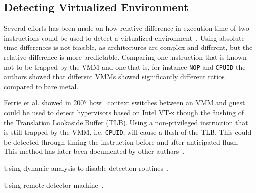 \subsection{Detecting Virtualized Environment}



Several efforts has been made on how relative difference in execution time of
two instructions could be used to detect a virtualized
environment~\cite{raffetseder2007, thompson}. Using absolute time differences is
not feasible, as architectures are complex and different, but the relative
difference is more predictable. Comparing one instruction that is known not to
be trapped by the VMM and one that is, for instance {\tt NOP} and {\tt CPUID}
the authors showed that different VMMs showed significantly different ratios
compared to bare metal.

Ferrie {et al.} showed in 2007 how~\cite{ferrie2007} context switches between an
VMM and guest could be used to detect hypervisors based on Intel VT-x though the
flushing of the Translation Lookaside Buffer (TLB). Using a non-privileged
instruction that is still trapped by the VMM, i.e. {\tt CPUID}, will cause a
flush of the TLB. This could be detected through timing the instruction before
and after anticipated flush. This method has later been documented by other
authors~\cite{thompson}.

Using dynamic analysis to disable detection routines~\cite{kang2009}.

Using remote detector machine~\cite{franklin2008}.

